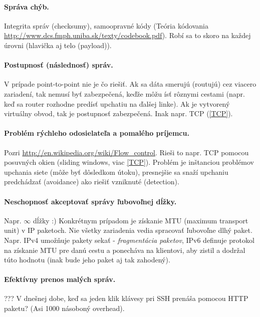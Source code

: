 \paragraph{Správa chýb.}
Integrita správ (checksumy), samoopravné kódy (Teória kódovania \url{http://www.dcs.fmph.uniba.sk/texty/codebook.pdf}). 
Robí sa to skoro na každej úrovni (hlavička aj telo (payload)).
                  
\paragraph{Postupnosť (následnosť) správ.}
V prípade point-to-point nie je čo riešiť. Ak sa dáta smerujú (routujú) cez viacero zariadení, tak nemusí byť zabezpečená, keďže môžu ísť rôznymi cestami (napr. keď sa router rozhodne predísť upchatiu na ďalšej linke). 
Ak je vytvorený virtuálny obvod, tak je postupnosť zabezpečená. Inak napr. TCP (\ref{TCP}).
 
\paragraph{Problém rýchleho odosielateľa a pomalého príjemcu.}
Pozri \url{http://en.wikipedia.org/wiki/Flow_control}.
Rieši to napr. TCP pomocou posuvných okien (sliding windows, viac \ref{TCP}).
Problém je inštanciou problémov upchania siete (môže byť dôsledkom útoku),
presnejšie sa snaží upchaniu predchádzať (avoidance) ako riešiť vzniknuté (detection).
  
\paragraph{Neschopnosť akceptovať správy ľubovoľnej dĺžky.}  
Napr. $\infty$ dĺžky :)
Konkrétnym prípadom je získanie MTU (maximum transport unit) v IP paketoch. 
Nie všetky zariadenia vedia spracovať ľubovoľne dlhý paket. Napr. IPv4 umožňuje pakety sekať - \emph{fragmentácia paketov}, IPv6 definuje protokol na získanie MTU pre danú cestu a ponecháva na klientovi, aby zistil a dodržal túto hodnotu (inak bude jeho paket aj tak zahodený).

\paragraph{Efektívny prenos malých správ.} 
???
V dnešnej dobe, keď sa jeden klik klávesy pri SSH prenáša pomocou HTTP paketu?
(Asi 1000 násoboný overhead).
      
